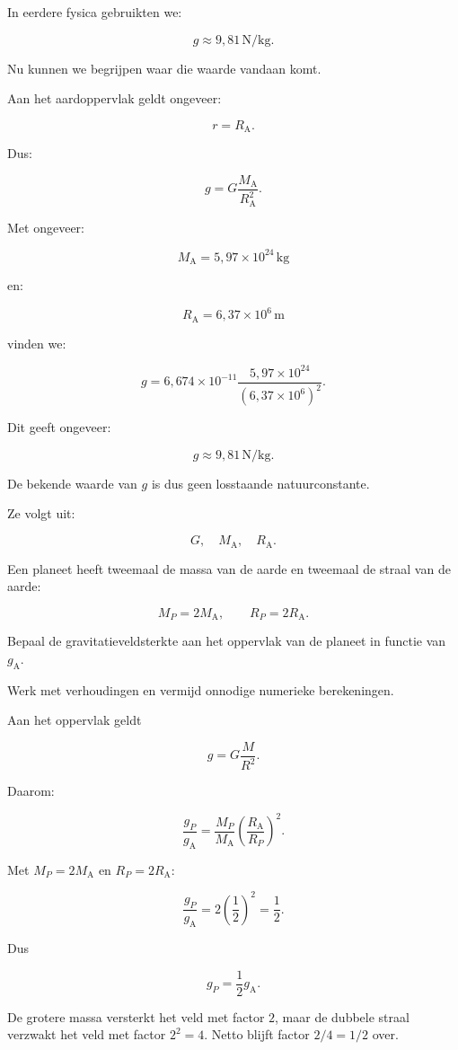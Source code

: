 \documentclass{ximera}
\begin{document}

In eerdere fysica gebruikten we:

\[
g\approx9{,}81\,\mathrm{N/kg}.
\]

Nu kunnen we begrijpen waar die waarde vandaan komt.

Aan het aardoppervlak geldt ongeveer:

\[
r=R_\mathrm A.
\]

Dus:

\[
g
=
G\frac{M_\mathrm A}{R_\mathrm A^2}.
\]

Met ongeveer:

\[
M_\mathrm A
=
5{,}97\times10^{24}\,\mathrm{kg}
\]

en:

\[
R_\mathrm A
=
6{,}37\times10^6\,\mathrm m
\]

vinden we:

\[
g
=
6{,}674\times10^{-11}
\frac{5{,}97\times10^{24}}
{(6{,}37\times10^6)^2}.
\]

Dit geeft ongeveer:

\[
\boxed{
g\approx9{,}81\,\mathrm{N/kg}.
}
\]

De bekende waarde van $g$ is dus geen losstaande natuurconstante.

Ze volgt uit:

\[
\boxed{
G,\quad M_\mathrm A,\quad R_\mathrm A.
}
\]


\begin{oefening}{\oefU\ESS}

Een planeet heeft tweemaal de massa van de aarde en tweemaal de straal
van de aarde:

\[
M_P=2M_\mathrm A,
\qquad
R_P=2R_\mathrm A.
\]

Bepaal de gravitatieveldsterkte aan het oppervlak van de planeet in
functie van $g_\mathrm A$.

Werk met verhoudingen en vermijd onnodige numerieke berekeningen.


\begin{oplossing}

Aan het oppervlak geldt

\[
g=G\frac{M}{R^2}.
\]

Daarom:

\[
\frac{g_P}{g_\mathrm A}
=
\frac{M_P}{M_\mathrm A}
\left(\frac{R_\mathrm A}{R_P}\right)^2.
\]

Met $M_P=2M_\mathrm A$ en $R_P=2R_\mathrm A$:

\[
\frac{g_P}{g_\mathrm A}
=
2\left(\frac12\right)^2
=
\frac12.
\]

Dus

\[
\boxed{
g_P=\frac12g_\mathrm A.
}
\]

De grotere massa versterkt het veld met factor $2$, maar de dubbele
straal verzwakt het veld met factor $2^2=4$. Netto blijft factor
$2/4=1/2$ over.

\end{oplossing}

\end{oefening}
\end{document}

